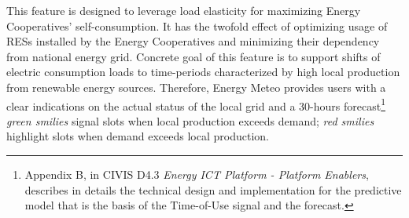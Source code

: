 This feature is designed to leverage load elasticity for maximizing Energy Cooperatives' self-consumption.
It has the twofold effect of optimizing usage of RESs installed by the Energy Cooperatives and minimizing their dependency from national energy grid.
Concrete goal of this feature is to support shifts of electric consumption loads to time-periods characterized by high local production from renewable energy sources.
Therefore, Energy Meteo provides users with a clear indications on the actual status of the local grid and a 30-hours forecast\footnote{Appendix B, in CIVIS D4.3 \textit{Energy ICT Platform - Platform Enablers}, describes in details the technical design and implementation for the predictive model
that is the basis of the Time-of-Use signal and the forecast.} \textit{green smilies} signal slots when local production exceeds demand; \textit{red smilies} highlight slots when demand exceeds local production.

